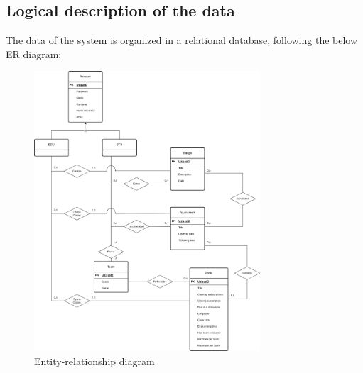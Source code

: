 \subsection{Logical description of the data}
The data of the system is organized in a relational database, following the below ER diagram:

\begin{figure}[H]
    \centering
    \includegraphics[width=0.75\textwidth]{images/diagrams/er_diagram.png}
    \caption{Entity-relationship diagram}
    \label{fig:er_diagram}
\end{figure}

